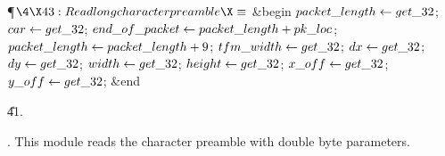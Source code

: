 \Y\P$\4\X43:Read long character preamble\X\S$\6
\&{begin} $\\{packet\_length}\gets\\{get\_32}$;\5
$\\{car}\gets\\{get\_32}$;\5
$\\{end\_of\_packet}\gets\\{packet\_length}+\\{pk\_loc}$;\5
$\\{packet\_length}\gets\\{packet\_length}+9$;\5
$\\{tfm\_width}\gets\\{get\_32}$;\5
$\\{dx}\gets\\{get\_32}$;\5
$\\{dy}\gets\\{get\_32}$;\5
$\\{width}\gets\\{get\_32}$;\5
$\\{height}\gets\\{get\_32}$;\5
$\\{x\_off}\gets\\{get\_32}$;\5
$\\{y\_off}\gets\\{get\_32}$;\6
\&{end}\par
\U41.\fi

. This module reads the character preamble with double byte parameters.

